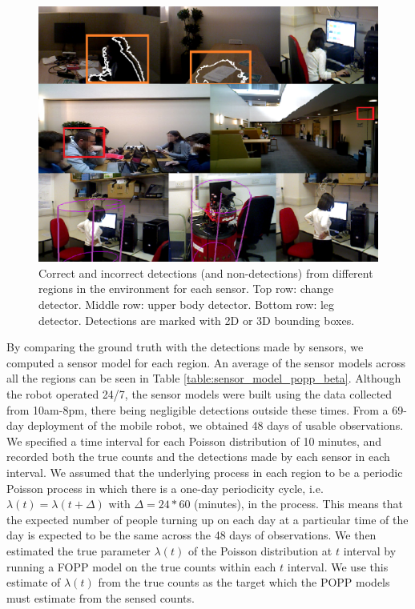 \begin{figure}[t]
	\centering
	\includegraphics[width=0.95\columnwidth]{./figures/sensor_images.png}
	\caption{Correct and incorrect detections (and non-detections) from different regions in the environment for each sensor. Top row: change detector. Middle row: upper body detector. Bottom row: leg detector. Detections are marked with 2D or 3D bounding boxes.}
	\label{fig:single_sensor_rate_transformation}
\end{figure}

By comparing the ground truth with the detections made by sensors, we computed a sensor model for each region. An average of the sensor models across all the regions can be seen in Table \ref{table:sensor_model_popp_beta}. Although the robot operated 24/7, the sensor models were built using the data collected from 10am-8pm, there being negligible detections outside these times. From a 69-day deployment of the mobile robot, we obtained 48 days of usable observations. We specified a time interval for each Poisson distribution of 10 minutes, and recorded both the true counts and the detections made by each sensor in each interval. We assumed that the underlying process in each region to be a periodic Poisson process in which there is a one-day periodicity cycle, i.e. $\lambda(t) = \lambda(t + \Delta)$ with $\Delta = 24 * 60$ (minutes), in the process. This means that the expected number of people turning up on each day at a particular time of the day is expected to be the same across the 48 days of observations. We then estimated the true parameter $\lambda(t)$ of the Poisson distribution at $t$ interval by running a FOPP model on the true counts within each $t$ interval. We use this estimate of $\lambda(t)$ from the true counts as the target which the POPP models must estimate from the sensed counts.


